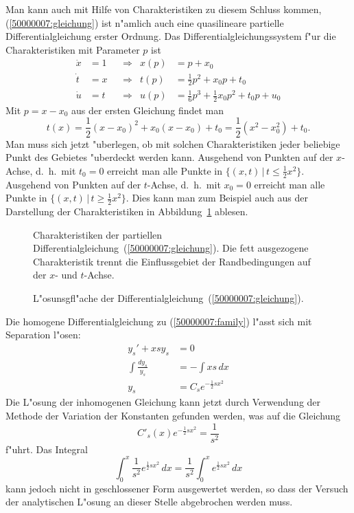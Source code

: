 \begin{loesung}
\begin{teilaufgaben}
Man kann auch mit Hilfe von Charakteristiken zu diesem Schluss kommen, 
(\ref{50000007:gleichung}) ist n"amlich auch eine quasilineare partielle
Differentialgleichung erster Ordnung.
Das Differentialgleichungssystem f"ur die Charakteristiken mit Parameter $p$
ist
\begin{align*}
\dot x&=1&&\Rightarrow&x(p)&=p+x_0\\
\dot t&=x&&\Rightarrow&t(p)&=\frac12p^2+x_0p+t_0\\
\dot u&=t&&\Rightarrow&u(p)&=\frac16p^3+\frac12x_0p^2+t_0p+u_0
\end{align*}
Mit $p=x-x_0$ aus der ersten Gleichung findet man
\[
t(x)=\frac12(x-x_0)^2+x_0(x-x_0)+t_0=\frac12(x^2-x_0^2)+t_0.
\]
Man muss sich jetzt "uberlegen, ob mit solchen Charakteristiken
jeder beliebige Punkt des Gebietes "uberdeckt werden kann.
Ausgehend von Punkten auf der $x$-Achse, d.~h.~mit $t_0=0$
erreicht man alle Punkte in $\{(x,t)\,|\, t\le \frac12x^2\}$.
Ausgehend von Punkten auf der $t$-Achse, d.~h.~mit $x_0=0$
erreicht man alle Punkte in $\{(x,t)\,|\, t\ge \frac12x^2\}$.
Dies kann man zum Beispiel auch aus der Darstellung
der Charakteristiken in Abbildung~\ref{50000007:bild}
ablesen.
\begin{figure}
\begin{center}
\end{center}
\caption{Charakteristiken der partiellen
Differentialgleichung~(\ref{50000007:gleichung}).
Die fett ausgezogene Charakteristik trennt die Einflussgebiet der
Randbedingungen auf der $x$- und $t$-Achse.
\label{50000007:bild}}
\end{figure}
\begin{figure}
\centering
{}
\caption{L"osunsgfl"ache der Differentialgleichung~(\ref{50000007:gleichung}).
\label{50000007:loesungsflaeche}}
\end{figure}
\item
Die homogene Differentialgleichung zu (\ref{50000007:family}) l"asst sich
mit Separation l"osen:
\begin{align*}
y_s'  + xsy_s&=0
\\
\int\frac{dy_s}{y_s}&=-\int xs\,dx
\\
y_s&=C_se^{-\frac12sx^2}
\end{align*}
Die L"osung der inhomogenen Gleichung kann jetzt durch Verwendung der
Methode der Variation der Konstanten gefunden werden, was auf die
Gleichung 
\[
C'_s(x)e^{-\frac12sx^2}=\frac1{s^2}
\]
f"uhrt.
Das Integral 
\[
\int_0^x\frac1{s^2}e^{\frac12sx^2}\,dx
=\frac1{s^2}
\int_0^xe^{\frac12sx^2}\,dx
\]
kann jedoch nicht in geschlossener Form ausgewertet werden, so dass der
Versuch der analytischen L"osung an dieser Stelle abgebrochen werden muss.
\qedhere
\end{teilaufgaben}
\end{loesung}

